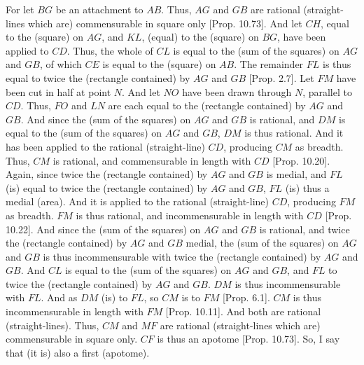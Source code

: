 \begin{Parallel}{}{}
{For let $BG$ be an attachment to $AB$. Thus, $AG$ and $GB$
are rational (straight-lines which are) commensurable in square only
[Prop. 10.73]. And let $CH$, equal to the
(square) on $AG$, and $KL$, (equal) to the (square) on $BG$, have been applied to $CD$. Thus, the whole of $CL$ is equal to the (sum of the
squares) on $AG$ and $GB$, of which $CE$ is equal to the (square) on
$AB$. The remainder $FL$ is thus equal to twice the (rectangle contained)
by $AG$ and $GB$ [Prop. 2.7]. Let $FM$
have been cut in half at point $N$. And let $NO$ have been drawn
through $N$, parallel to $CD$. Thus, $FO$ and $LN$ are each equal to
the (rectangle contained) by $AG$ and $GB$. And since the (sum of the
squares) on $AG$ and $GB$ is rational, and $DM$ is equal to the (sum of the squares) on
$AG$ and $GB$, $DM$ is thus rational. And it has
been applied to the rational (straight-line) $CD$, producing $CM$ as breadth. Thus, $CM$
is rational, and commensurable in length with $CD$ [Prop. 10.20]. Again, since twice the
(rectangle contained) by $AG$ and $GB$ is medial, and $FL$
(is) equal to twice the (rectangle contained) by $AG$ and $GB$, $FL$
(is) thus a medial (area). And it is applied to the rational (straight-line)
$CD$, producing $FM$ as breadth. $FM$ is thus rational, and
incommensurable in  length with $CD$ [Prop. 10.22]. And since the (sum of the
squares) on $AG$ and $GB$ is rational, and twice the (rectangle contained)
by $AG$ and $GB$ medial, the (sum of the squares) on
$AG$ and $GB$ is thus incommensurable with twice the (rectangle
contained) by $AG$ and $GB$. And $CL$ is equal to the (sum of the
squares) on $AG$ and $GB$, and $FL$ to twice the (rectangle contained)
by $AG$ and $GB$. $DM$ is thus incommensurable with $FL$.
And as $DM$ (is) to $FL$, so $CM$ is to $FM$ [Prop. 6.1]. $CM$ is thus incommensurable in length
with $FM$ [Prop. 10.11]. And both are rational 
(straight-lines). Thus, $CM$ and $MF$ are rational (straight-lines
which are) commensurable in square only. $CF$ is thus an apotome
[Prop. 10.73]. So, I say that
(it is) also a first (apotome).

}
\end{Parallel}
